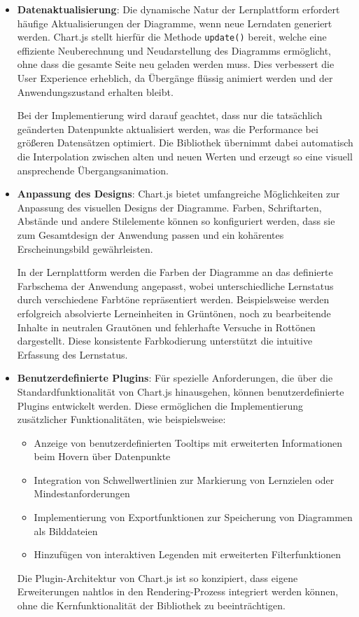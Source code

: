 \begin{itemize}
    \item \textbf{Datenaktualisierung}:  
        Die dynamische Natur der Lernplattform erfordert häufige Aktualisierungen der Diagramme, wenn neue Lerndaten generiert werden. Chart.js stellt hierfür die Methode \texttt{update()} bereit, welche eine effiziente Neuberechnung und Neudarstellung des Diagramms ermöglicht, ohne dass die gesamte Seite neu geladen werden muss. Dies verbessert die User Experience erheblich, da Übergänge flüssig animiert werden und der Anwendungszustand erhalten bleibt.
        
        Bei der Implementierung wird darauf geachtet, dass nur die tatsächlich geänderten Datenpunkte aktualisiert werden, was die Performance bei größeren Datensätzen optimiert. Die Bibliothek übernimmt dabei automatisch die Interpolation zwischen alten und neuen Werten und erzeugt so eine visuell ansprechende Übergangsanimation.
        
    \item \textbf{Anpassung des Designs}:
        Chart.js bietet umfangreiche Möglichkeiten zur Anpassung des visuellen Designs der Diagramme. Farben, Schriftarten, Abstände und andere Stilelemente können so konfiguriert werden, dass sie zum Gesamtdesign der Anwendung passen und ein kohärentes Erscheinungsbild gewährleisten. 
        
        In der Lernplattform werden die Farben der Diagramme an das definierte Farbschema der Anwendung angepasst, wobei unterschiedliche Lernstatus durch verschiedene Farbtöne repräsentiert werden. Beispielsweise werden erfolgreich absolvierte Lerneinheiten in Grüntönen, noch zu bearbeitende Inhalte in neutralen Grautönen und fehlerhafte Versuche in Rottönen dargestellt. Diese konsistente Farbkodierung unterstützt die intuitive Erfassung des Lernstatus.
        
    \item \textbf{Benutzerdefinierte Plugins}:
        Für spezielle Anforderungen, die über die Standardfunktionalität von Chart.js hinausgehen, können benutzerdefinierte Plugins entwickelt werden. Diese ermöglichen die Implementierung zusätzlicher Funktionalitäten, wie beispielsweise:
        \begin{itemize}
            \item Anzeige von benutzerdefinierten Tooltips mit erweiterten Informationen beim Hovern über Datenpunkte
            \item Integration von Schwellwertlinien zur Markierung von Lernzielen oder Mindestanforderungen
            \item Implementierung von Exportfunktionen zur Speicherung von Diagrammen als Bilddateien
            \item Hinzufügen von interaktiven Legenden mit erweiterten Filterfunktionen
        \end{itemize}
        Die Plugin-Architektur von Chart.js ist so konzipiert, dass eigene Erweiterungen nahtlos in den Rendering-Prozess integriert werden können, ohne die Kernfunktionalität der Bibliothek zu beeinträchtigen.
\end{itemize}

